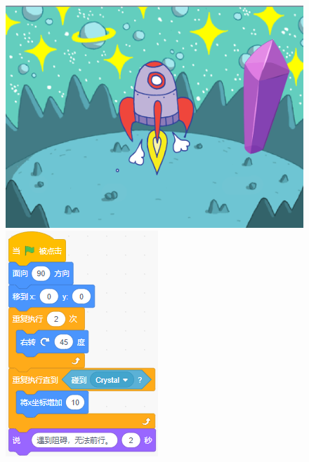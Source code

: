 \documentclass[10pt, a4paper]{article}
\begin{document}
\begin{enumerate}
\begin{figure}[htbp]
\begin{minipage}[t]{.46\textwidth}
\begin{minipage}[t]{.55\textwidth}
                    \includegraphics[width=\textwidth]{figure/24-1.png}
                \end{minipage}
                \begin{minipage}[t]{.35\textwidth}
                    \centering
                    \includegraphics[width=\textwidth]{figure/24-2.png}

\end{minipage}
\end{minipage}
\end{figure}
\end{enumerate}
\end{document}
